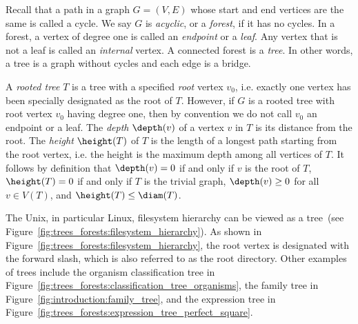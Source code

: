 Recall that a path in a graph $G = (V, E)$ whose start and
end vertices are the same is called a cycle. We say $G$ is
\emph{acyclic}, or a \emph{forest}, if it
has no cycles. In a forest, a vertex of degree one is called an
\emph{endpoint} or a \emph{leaf}. Any
vertex that is not a leaf is called an \emph{internal}
vertex. A connected forest is a
\emph{tree}. In other words, a tree is a graph
without cycles and each edge is a bridge.

A \emph{rooted tree} $T$ is a tree with
a specified \emph{root} vertex $v_0$, i.e. exactly
one vertex has been specially designated as the root of $T$. However,
if $G$ is a rooted tree with root vertex $v_0$
having degree one, then by convention we do not call $v_0$ an
endpoint or a leaf. The
\emph{depth}
$\depth(v)$ of a vertex $v$ in $T$ is its
distance from the
root. The \emph{height}
$\height(T)$ of $T$ is the
length of a longest path starting from
the root vertex, i.e. the height
is the maximum depth among all vertices of $T$. It
follows by definition that $\depth(v) = 0$ if and
only if $v$ is the root of $T$, $\height(T) = 0$ if
and only if $T$ is the trivial graph,
$\depth(v) \geq 0$ for all $v \in V(T)$, and
$\height(T) \leq \diam(T)$.

The Unix, in particular Linux,
filesystem hierarchy
can be viewed as a tree~(see
Figure~\ref{fig:trees_forests:filesystem_hierarchy}). As shown in
Figure~\ref{fig:trees_forests:filesystem_hierarchy}, the
root vertex is designated with the forward slash,
which is also referred to as the root
directory. Other examples of trees include the
organism classification tree in
Figure~\ref{fig:trees_forests:classification_tree_organisms}, the
family tree in
Figure~\ref{fig:introduction:family_tree}, and the
expression tree in
Figure~\ref{fig:trees_forests:expression_tree_perfect_square}.

